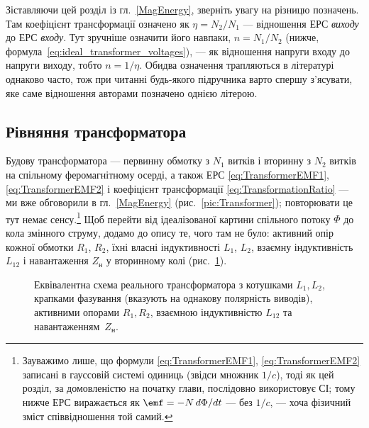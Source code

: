 \begin{Attention}
	Зіставляючи цей розділ із гл.~\ref{MagEnergy}, зверніть увагу
	на різницю позначень. Там коефіцієнт трансформації означено
	як $\eta = N_2/N_1$ --- відношення ЕРС \emph{виходу} до ЕРС
	\emph{входу}. Тут зручніше означити його навпаки, $n =
	N_1/N_2$ (нижче, формула~\eqref{eq:ideal_transformer_voltages}),
	--- як відношення напруги входу до напруги виходу, тобто
	$n = 1/\eta$. Обидва означення трапляються в літературі
	однаково часто, тож при читанні будь-якого підручника варто
	спершу з'ясувати, яке саме відношення авторами позначено
	однією літерою.
\end{Attention}

\subsection*{Рівняння трансформатора}

Будову трансформатора --- первинну обмотку з $N_1$ витків і
вторинну з $N_2$ витків на спільному феромагнітному осерді, а
також ЕРС \eqref{eq:TransformerEMF1}, \eqref{eq:TransformerEMF2}
і коефіцієнт трансформації \eqref{eq:TransformationRatio} --- ми
вже обговорили в гл.~\ref{MagEnergy} (рис.~\ref{pic:Transformer});
повторювати це тут немає сенсу.\footnote{Зауважимо лише, що
формули \eqref{eq:TransformerEMF1}, \eqref{eq:TransformerEMF2}
записані в гауссовій системі одиниць (звідси множник $1/c$), тоді
як цей розділ, за домовленістю на початку глави, послідовно
використовує СІ; тому нижче ЕРС виражається як $\emf=-N\,d\Phi/dt$
--- без $1/c$, --- хоча фізичний зміст співвідношення той самий.}
Щоб перейти від ідеалізованої картини спільного потоку $\Phi$ до
кола змінного струму, додамо до опису те, чого там не було:
активний опір кожної обмотки $R_1$, $R_2$, їхні власні
індуктивності $L_1$, $L_2$, взаємну індуктивність $L_{12}$ і
навантаження $Z_{\text{н}}$ у вторинному колі (рис.~\ref{pic:transformer_circuit}).

\begin{figure}[h!]
	\centering
	\caption{Еквівалентна схема реального трансформатора з котушками $L_1, L_2$, крапками фазування (вказують на однакову полярність виводів), активними опорами $R_1, R_2$, взаємною індуктивністю $L_{12}$ та навантаженням~$Z_{\text{н}}$.}
	\label{pic:transformer_circuit}
\end{figure}

